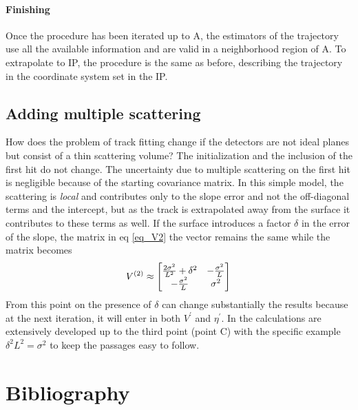 \begin{refsection}
\paragraph{Finishing} Once the procedure has been iterated  up to A, 
the estimators of the trajectory use all the available information and are valid in a neighborhood region of A. 
To extrapolate to IP, 
the procedure is the same as before, 
describing the trajectory in the coordinate system set in the IP. 

\subsection{Adding multiple scattering}
How does the problem of track fitting change if the detectors are not ideal planes but consist of a thin scattering volume? 
The initialization and the inclusion of the first hit do not change. 
The uncertainty due to multiple scattering on the first hit is negligible because of the starting covariance matrix. 
In this simple model, the scattering is \textit{local} and contributes only to the slope error and not the off-diagonal terms 
and the intercept, but as the track is extrapolated away from the surface it contributes to these terms as well.
If the surface introduces a factor $\delta$ in the error of the slope, 
the matrix in eq \ref{eq_V2} the vector remains the same while the matrix becomes
$$
V^{(2)}\approx
\begin{bmatrix}
\frac{2\sigma^2}{L^2}+\delta^2 & -\frac{\sigma^2}{L} \\
-\frac{\sigma^2}{L} & \sigma^2
\end{bmatrix}\\
$$
From this point on the presence of $\delta$ can change substantially the results because at the next iteration, it will enter in both $V^\prime$ and $\eta^\prime$.
 In \cite{KutschkePaper} the calculations are extensively developed up to the third point (point C) 
 with the specific example $\delta^2L^2=\sigma^2$ to keep the passages easy to follow.

\section*{Bibliography}
\printbibliography[heading=none]
\end{refsection}